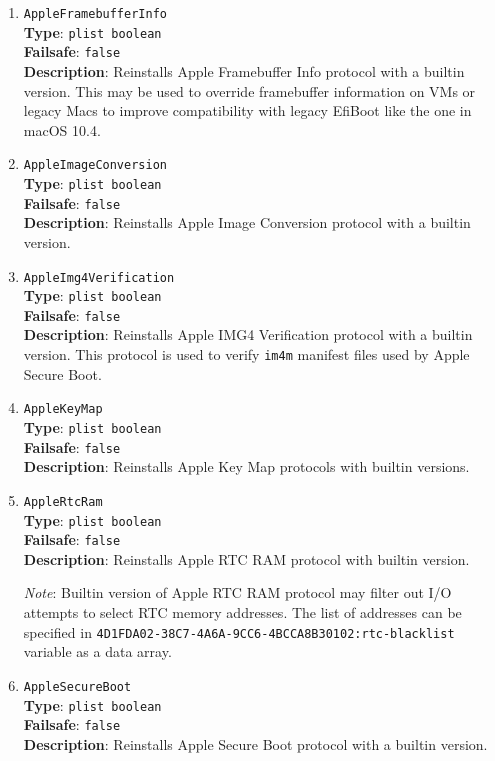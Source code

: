 \documentclass[]{article}
\begin{document}
\begin{enumerate}
\item
  \texttt{AppleFramebufferInfo}\\
  \textbf{Type}: \texttt{plist\ boolean}\\
  \textbf{Failsafe}: \texttt{false}\\
  \textbf{Description}: Reinstalls Apple Framebuffer Info protocol with a builtin
  version. This may be used to override framebuffer information on VMs or legacy Macs
  to improve compatibility with legacy EfiBoot like the one in macOS 10.4.

\item
  \texttt{AppleImageConversion}\\
  \textbf{Type}: \texttt{plist\ boolean}\\
  \textbf{Failsafe}: \texttt{false}\\
  \textbf{Description}: Reinstalls Apple Image Conversion protocol with a builtin
  version.

\item
  \texttt{AppleImg4Verification}\\
  \textbf{Type}: \texttt{plist\ boolean}\\
  \textbf{Failsafe}: \texttt{false}\\
  \textbf{Description}: Reinstalls Apple IMG4 Verification protocol with a builtin
  version. This protocol is used to verify \texttt{im4m} manifest files used by
  Apple Secure Boot.

\item
  \texttt{AppleKeyMap}\\
  \textbf{Type}: \texttt{plist\ boolean}\\
  \textbf{Failsafe}: \texttt{false}\\
  \textbf{Description}: Reinstalls Apple Key Map protocols with builtin
  versions.

\item
  \texttt{AppleRtcRam}\\
  \textbf{Type}: \texttt{plist\ boolean}\\
  \textbf{Failsafe}: \texttt{false}\\
  \textbf{Description}: Reinstalls Apple RTC RAM protocol with builtin
  version.

  \emph{Note}: Builtin version of Apple RTC RAM protocol may filter out
  I/O attempts to select RTC memory addresses. The list of addresses
  can be specified in \texttt{4D1FDA02-38C7-4A6A-9CC6-4BCCA8B30102:rtc-blacklist}
  variable as a data array.

\item
  \texttt{AppleSecureBoot}\\
  \textbf{Type}: \texttt{plist\ boolean}\\
  \textbf{Failsafe}: \texttt{false}\\
  \textbf{Description}: Reinstalls Apple Secure Boot protocol with a builtin
  version.


\end{enumerate}
\end{document}
